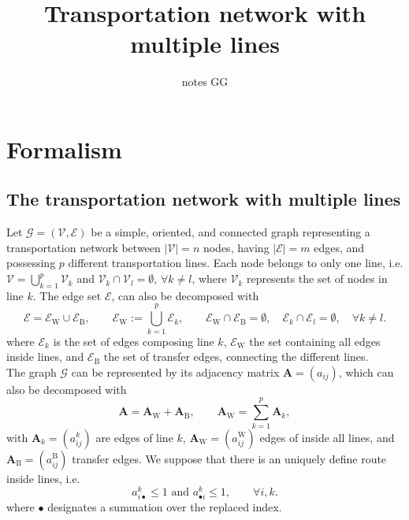 \documentclass[11p]{article}
\title{Transportation network with multiple lines}
\author{notes GG}
\begin{document}
\maketitle

\section{Formalism}

\subsection{The transportation network with multiple lines}

Let $\mathcal{G} = (\mathcal{V}, \mathcal{E})$ be a simple, oriented, and connected graph representing a transportation network between $|\mathcal{V}| = n$ nodes, having $|\mathcal{E}| = m$ edges, and possessing $p$ different transportation lines. Each node belongs to only one line, i.e. $\mathcal{V} = \bigcup_{k=1}^p \mathcal{V}_k$ and $\mathcal{V}_k \cap \mathcal{V}_l = \emptyset, \, \forall k\neq l$, where $\mathcal{V}_k$ represents the set of nodes in line $k$. The edge set $\mathcal{E}$, can also be decomposed with
\begin{equation}
\mathcal{E} = \mathcal{E}_\text{W} \cup \mathcal{E}_\text{B}, \qquad \mathcal{E}_\text{W} := \bigcup_{k=1}^p \mathcal{E}_k, \qquad \mathcal{E}_\text{W} \cap \mathcal{E}_\text{B} = \emptyset, \quad \mathcal{E}_k \cap \mathcal{E}_l = \emptyset, \quad \forall k\neq l.
\end{equation}
where $\mathcal{E}_k$ is the set of edges composing line $k$, $\mathcal{E}_\text{W}$ the set containing all edges inside lines, and $\mathcal{E}_\text{B}$ the set of transfer edges, connecting the different lines. \\
The graph $\mathcal{G}$ can be represented by its adjacency matrix $\mathbf{A} = (a_{ij})$, which can also be decomposed with 
\begin{equation}
\mathbf{A} = \mathbf{A}_\text{W} + \mathbf{A}_\text{B}, \qquad \mathbf{A}_\text{W} = \sum_{k=1}^p \mathbf{A}_k,
\end{equation}
with $\mathbf{A}_k = (a^k_{ij})$ are edges of line $k$, $\mathbf{A}_\text{W} = (a^\text{W}_{ij})$ edges of inside all lines, and $\mathbf{A}_\text{B} = (a^\text{B}_{ij})$ transfer edges. We suppose that there is an uniquely define route inside lines, i.e. 
\begin{equation}
a^k_{i \bullet} \leq 1 \text{ and } a^k_{\bullet i} \leq 1, \qquad \forall i,k.
\end{equation}
where $\bullet$ designates a summation over the replaced index.
\end{document}
